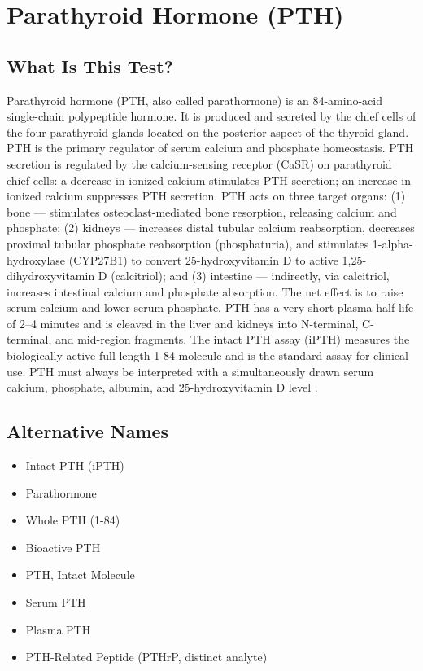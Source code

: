 \chapter{Parathyroid Hormone (PTH)}

\section*{What Is This Test?}
Parathyroid hormone (PTH, also called parathormone) is an 84-amino-acid single-chain polypeptide hormone. It is produced and secreted by the chief cells of the four parathyroid glands located on the posterior aspect of the thyroid gland. PTH is the primary regulator of serum calcium and phosphate homeostasis. PTH secretion is regulated by the calcium-sensing receptor (CaSR) on parathyroid chief cells: a decrease in ionized calcium stimulates PTH secretion; an increase in ionized calcium suppresses PTH secretion. PTH acts on three target organs: (1) bone --- stimulates osteoclast-mediated bone resorption, releasing calcium and phosphate; (2) kidneys --- increases distal tubular calcium reabsorption, decreases proximal tubular phosphate reabsorption (phosphaturia), and stimulates 1-alpha-hydroxylase (CYP27B1) to convert 25-hydroxyvitamin D to active 1,25-dihydroxyvitamin D (calcitriol); and (3) intestine --- indirectly, via calcitriol, increases intestinal calcium and phosphate absorption. The net effect is to raise serum calcium and lower serum phosphate. PTH has a very short plasma half-life of 2--4 minutes and is cleaved in the liver and kidneys into N-terminal, C-terminal, and mid-region fragments. The intact PTH assay (iPTH) measures the biologically active full-length 1-84 molecule and is the standard assay for clinical use. PTH must always be interpreted with a simultaneously drawn serum calcium, phosphate, albumin, and 25-hydroxyvitamin D level \cite{tietz2012textbook}.

\section*{Alternative Names}
\begin{itemize}
  \item Intact PTH (iPTH)
  \item Parathormone
  \item Whole PTH (1-84)
  \item Bioactive PTH
  \item PTH, Intact Molecule
  \item Serum PTH
  \item Plasma PTH
  \item PTH-Related Peptide (PTHrP, distinct analyte)
\end{itemize}
